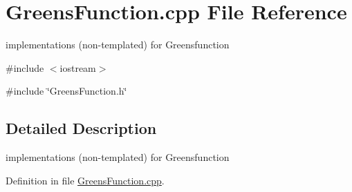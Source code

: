 \section{GreensFunction.cpp File Reference}
\label{GreensFunction_8cpp}


implementations (non-\/templated) for Greensfunction  


{\ttfamily \#include $<$iostream$>$}\par
{\ttfamily \#include \char`\"{}GreensFunction.h\char`\"{}}\par


\subsection{Detailed Description}
implementations (non-\/templated) for Greensfunction 

Definition in file \hyperlink{GreensFunction_8cpp_source}{GreensFunction.cpp}.


